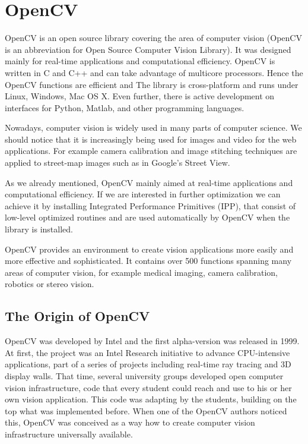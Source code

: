 \chapter{OpenCV}
OpenCV is an open source library covering the area of computer vision (OpenCV is an abbreviation for Open Source Computer Vision Library).
It was designed mainly for real-time applications and computational efficiency.
OpenCV is written in C and C++ and can take advantage of multicore processors.
Hence the OpenCV functions are efficient and 
The library is cross-platform and runs under Linux, Windows, Mac OS X.
Even further, there is active development on interfaces for Python, Matlab, and other programming languages.

Nowadays, computer vision is widely used in many parts of computer science.
We should notice that it is increasingly being used for images and video for the web applications.
For example camera calibration and image stitching techniques are applied to street-map images such as in Google's Street View.

As we already mentioned, OpenCV mainly aimed at real-time applications and computational efficiency. 
If we are interested in further optimization we can achieve it by installing Integrated Performance Primitives (IPP), that consist of low-level optimized routines
and are used automatically by OpenCV when the library is installed.

OpenCV provides an environment to create vision applications more easily and more effective and sophisticated.
It contains over 500 functions spanning many areas of computer vision, for example medical imaging, camera calibration, robotics or stereo vision.

\section{The Origin of OpenCV}
OpenCV was developed by Intel and the first alpha-version was released in 1999.
At first, the project was an Intel Research initiative to advance CPU-intensive applications, part of a series of projects including real-time ray tracing and 3D display walls.
That time, several university groups developed open computer vision infrastructure, code that every student could reach and use to his or her own vision application.
This code was adapting by the students, building on the top what was implemented before.
When one of the OpenCV authors noticed this, OpenCV was conceived as a way how to create computer vision infrastructure universally available.

